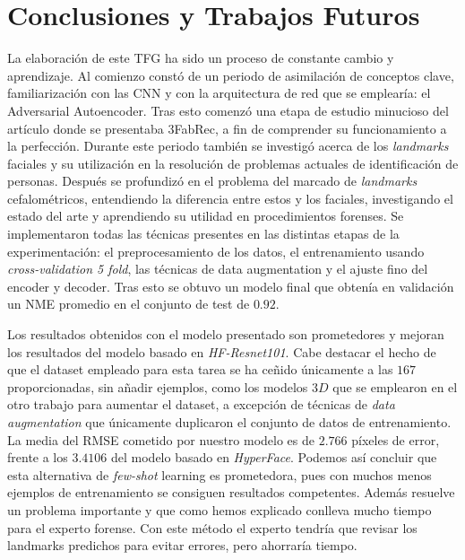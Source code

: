 \chapter{Conclusiones y Trabajos Futuros}

\noindent La elaboración de este TFG ha sido un proceso de constante cambio y aprendizaje. Al comienzo constó de un periodo de asimilación de conceptos clave, familiarización con las CNN y con la arquitectura de red que se emplearía: el Adversarial Autoencoder. Tras esto comenzó una etapa de estudio minucioso del artículo donde se presentaba 3FabRec, a fin de comprender su funcionamiento a la perfección. Durante este periodo también se investigó acerca de los \textit{landmarks} faciales y su utilización en la resolución de problemas actuales de identificación de personas. Después se profundizó en el problema del marcado de \textit{landmarks} cefalométricos, entendiendo la diferencia entre estos y los faciales, investigando el estado del arte y aprendiendo su utilidad en procedimientos forenses. Se implementaron todas las técnicas presentes en las distintas etapas de la experimentación: el preprocesamiento de los datos, el entrenamiento usando \textit{cross-validation 5 fold}, las técnicas de data augmentation y el ajuste fino del encoder y decoder. Tras esto se obtuvo un modelo final que obtenía en validación un NME promedio en el conjunto de test de $0.92$.

\medskip

\noindent Los resultados obtenidos con el modelo presentado son prometedores y mejoran los resultados del modelo basado en \textit{HF-Resnet101}. Cabe destacar el hecho de que el dataset empleado para esta tarea se ha ceñido únicamente a las $167$ proporcionadas, sin añadir ejemplos, como los modelos $3D$ que se emplearon en el otro trabajo para aumentar el dataset, a excepción de técnicas de \textit{data augmentation} que únicamente duplicaron el conjunto de datos de entrenamiento. La media del RMSE cometido por nuestro modelo es de $2.766$ píxeles de error, frente a los $3.4106$ del modelo basado en \textit{HyperFace}. Podemos así concluir que esta alternativa de \textit{few-shot} learning es prometedora, pues con muchos menos ejemplos de entrenamiento se consiguen resultados competentes. Además resuelve un problema importante y que como hemos explicado conlleva mucho tiempo para el experto forense. Con este método el experto tendría que revisar los landmarks predichos para evitar errores, pero ahorraría tiempo.

\medskip

